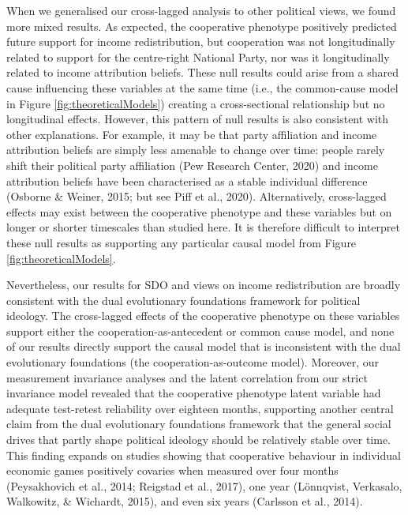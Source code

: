 \documentclass[
  man,floatsintext]{apa6}
\begin{document}
When we generalised our cross-lagged analysis to other political views, we found
more mixed results. As expected, the cooperative phenotype positively predicted
future support for income redistribution, but cooperation was not longitudinally
related to support for the centre-right National Party, nor was it
longitudinally related to income attribution beliefs. These null results could
arise from a shared cause influencing these variables at the same time (i.e.,
the common-cause model in Figure \ref{fig:theoreticalModels}) creating a
cross-sectional relationship but no longitudinal effects. However, this pattern
of null results is also consistent with other explanations. For example, it may
be that party affiliation and income attribution beliefs are simply less
amenable to change over time: people rarely shift their political party
affiliation (Pew Research Center, 2020) and income attribution beliefs have been
characterised as a stable individual difference (Osborne \& Weiner, 2015; but see Piff et al., 2020). Alternatively, cross-lagged effects may exist between the
cooperative phenotype and these variables but on longer or shorter timescales
than studied here. It is therefore difficult to interpret these null results
as supporting any particular causal model from Figure
\ref{fig:theoreticalModels}.

Nevertheless, our results for SDO and views on income redistribution are broadly
consistent with the dual evolutionary foundations framework for political
ideology. The cross-lagged effects of the cooperative phenotype on these
variables support either the cooperation-as-antecedent or common cause model,
and none of our results directly support the causal model that is inconsistent
with the dual evolutionary foundations (the cooperation-as-outcome model).
Moreover, our measurement invariance analyses and the latent correlation from
our strict invariance model revealed that the cooperative phenotype latent
variable had adequate test-retest reliability over eighteen months, supporting
another central claim from the dual evolutionary foundations framework that the
general social drives that partly shape political ideology should be relatively
stable over time. This finding expands on studies showing that cooperative
behaviour in individual economic games positively covaries when measured over
four months (Peysakhovich et al., 2014; Reigstad et al., 2017), one year (Lönnqvist, Verkasalo, Walkowitz, \& Wichardt, 2015), and
even six years (Carlsson et al., 2014).
\end{document}

